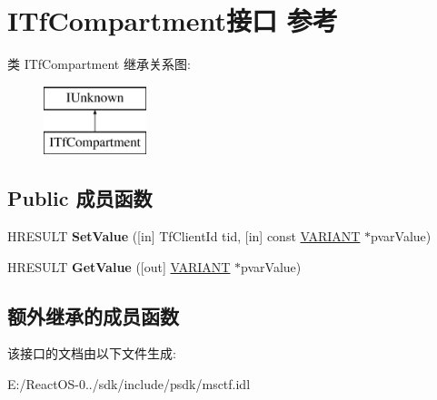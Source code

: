 \hypertarget{interface_i_tf_compartment}{}\section{I\+Tf\+Compartment接口 参考}
\label{interface_i_tf_compartment}
类 I\+Tf\+Compartment 继承关系图\+:\begin{figure}[H]
\begin{center}
\leavevmode
\includegraphics[height=2.000000cm]{interface_i_tf_compartment}
\end{center}
\end{figure}
\subsection*{Public 成员函数}
\begin{DoxyCompactItemize}
\item 
\mbox{\label{interface_i_tf_compartment_a1f22e6f575747d0813e1e8a052b920ee}} 
H\+R\+E\+S\+U\+LT {\bfseries Set\+Value} (\mbox{[}in\mbox{]} Tf\+Client\+Id tid, \mbox{[}in\mbox{]} const \hyperlink{structtag_v_a_r_i_a_n_t}{V\+A\+R\+I\+A\+NT} $\ast$pvar\+Value)
\item 
\mbox{\label{interface_i_tf_compartment_a8a7261ff67a44716dcb66def563b795e}} 
H\+R\+E\+S\+U\+LT {\bfseries Get\+Value} (\mbox{[}out\mbox{]} \hyperlink{structtag_v_a_r_i_a_n_t}{V\+A\+R\+I\+A\+NT} $\ast$pvar\+Value)
\end{DoxyCompactItemize}
\subsection*{额外继承的成员函数}


该接口的文档由以下文件生成\+:\begin{DoxyCompactItemize}
\item 
E\+:/\+React\+O\+S-\/0../sdk/include/psdk/msctf.\+idl\end{DoxyCompactItemize}
